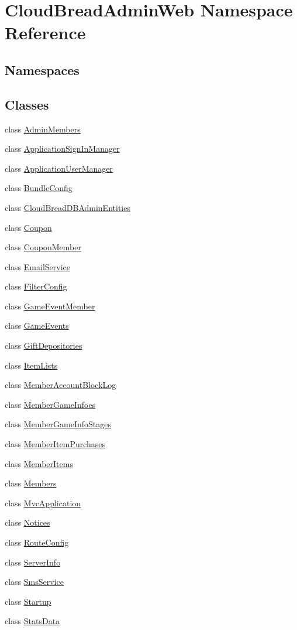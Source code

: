 \hypertarget{a00414}{}\section{Cloud\+Bread\+Admin\+Web Namespace Reference}
\label{a00414}
\subsection*{Namespaces}
\begin{DoxyCompactItemize}
\end{DoxyCompactItemize}
\subsection*{Classes}
\begin{DoxyCompactItemize}
\item 
class \hyperlink{a00012}{Admin\+Members}
\item 
class \hyperlink{a00017}{Application\+Sign\+In\+Manager}
\item 
class \hyperlink{a00019}{Application\+User\+Manager}
\item 
class \hyperlink{a00022}{Bundle\+Config}
\item 
class \hyperlink{a00065}{Cloud\+Bread\+D\+B\+Admin\+Entities}
\item 
class \hyperlink{a00068}{Coupon}
\item 
class \hyperlink{a00069}{Coupon\+Member}
\item 
class \hyperlink{a00074}{Email\+Service}
\item 
class \hyperlink{a00078}{Filter\+Config}
\item 
class \hyperlink{a00081}{Game\+Event\+Member}
\item 
class \hyperlink{a00083}{Game\+Events}
\item 
class \hyperlink{a00086}{Gift\+Depositories}
\item 
class \hyperlink{a00127}{Item\+Lists}
\item 
class \hyperlink{a00135}{Member\+Account\+Block\+Log}
\item 
class \hyperlink{a00137}{Member\+Game\+Infoes}
\item 
class \hyperlink{a00139}{Member\+Game\+Info\+Stages}
\item 
class \hyperlink{a00141}{Member\+Item\+Purchases}
\item 
class \hyperlink{a00143}{Member\+Items}
\item 
class \hyperlink{a00145}{Members}
\item 
class \hyperlink{a00167}{Mvc\+Application}
\item 
class \hyperlink{a00168}{Notices}
\item 
class \hyperlink{a00175}{Route\+Config}
\item 
class \hyperlink{a00178}{Server\+Info}
\item 
class \hyperlink{a00182}{Sms\+Service}
\item 
class \hyperlink{a00184}{Startup}
\item 
class \hyperlink{a00185}{Stats\+Data}
\end{DoxyCompactItemize}
